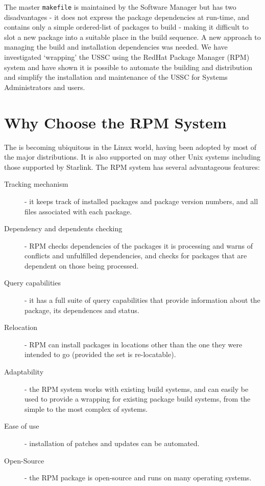 The master {\tt{makefile}} is maintained by the Software Manager but
has two disadvantages - it does not express the package dependencies at
run-time, and contains only a simple ordered-list of packages to build
- making it difficult to slot a new package into a suitable place in
the build sequence.  A new approach to managing the build and
installation dependencies was needed.  We have investigated `wrapping'
the USSC using the RedHat Package Manager (RPM) system and have shown
it is possible to automate the building and distribution and simplify
the installation and maintenance of the USSC for Systems Administrators
and users.

\section{Why Choose the RPM System}

The 
is becoming ubiquitous in the Linux world, having been adopted by most
of the major distributions.  It is also supported on may other Unix
systems including those supported by Starlink.  The RPM system has
several advantageous features:

\begin{description}

\item[Tracking mechanism] - it keeps track of installed packages and
package version numbers, and all files associated with each package.

\item[Dependency and dependents checking] - RPM checks dependencies of
the packages it is processing and warns of conflicts and unfulfilled
dependencies, and checks for packages that are dependent on those
being processed.

\item[Query capabilities] - it has a full suite of query capabilities
that provide information about the package, its dependences and status.

\item[Relocation] - RPM can install packages in locations other than the
one they were intended to go (provided the set is re-locatable).

\item[Adaptability] - the RPM system works with existing build systems,
and can easily be used to provide a wrapping for existing package build
systems, from the simple to the most complex of systems.

\item[Ease of use] - installation of patches and updates can be automated.

\item[Open-Source] - the RPM package is open-source and runs on many
operating systems.

\end{description}


